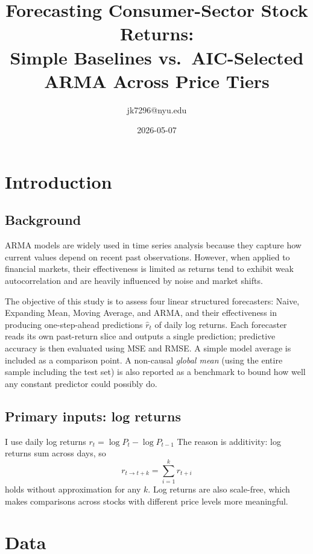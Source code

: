 \documentclass[10pt,a4paper,twocolumn]{article}
\title{\textbf{Forecasting Consumer-Sector Stock Returns:\\
Simple Baselines vs.\ AIC-Selected ARMA Across Price Tiers}}
\author{jk7296@nyu.edu}
\date{2026-05-07}
\begin{document}
\twocolumn[
  \begin{@twocolumnfalse}
    \maketitle
    \medskip
  \end{@twocolumnfalse}
]

\section{Introduction}
\label{sec:intro}

\subsection{Background}
ARMA models are widely used in time series analysis because they capture how current values depend on recent past observations. However, when applied to financial markets, their effectiveness is limited as returns tend to exhibit weak autocorrelation and are heavily influenced by noise and market shifts. 

The objective of this study is to assess four linear structured forecasters: Naive, Expanding Mean, Moving Average, and ARMA, and their effectiveness in producing one-step-ahead predictions $\hat r_t$ of daily log returns. Each forecaster reads its own past-return slice and outputs a single prediction; predictive accuracy is then evaluated using MSE and RMSE. A simple model average is included as a comparison point. A non-causal \emph{global mean} (using the entire sample including the test set) is also reported as a benchmark to bound how well any constant predictor could possibly do.

\subsection{Primary inputs: log returns}
\label{sec:logret}
I use daily log returns $r_t = \log P_t - \log P_{t-1}$ The reason is additivity: log returns sum across days, so
\begin{equation}
r_{t \to t+k} = \sum_{i=1}^{k} r_{t+i}
\label{eq:additivity}
\end{equation}
holds without approximation for any $k$. 
Log returns are also scale-free, which makes comparisons across stocks with different price levels more meaningful.

\section{Data}
\label{sec:data}
\end{document}
